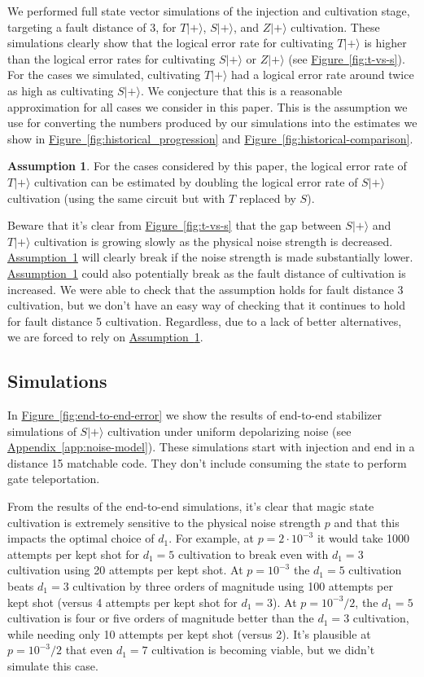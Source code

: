 \documentclass[onecolumn,unpublished,a4paper]{quantumarticle}
\theoremstyle{definition}
\newtheorem{assumption}[definition]{Assumption}
\DeclareRobustCommand{\app}[1]{\hyperref[app:#1]{Appendix~\ref*{app:#1}}}
\newcommand{\ass}[1]{\hyperref[ass:#1]{Assumption~\ref*{ass:#1}}}
\newcommand{\fig}[1]{\hyperref[fig:#1]{Figure~\ref*{fig:#1}}}
\begin{document}
We performed full state vector simulations of the injection and cultivation stage, targeting a fault distance of 3, for $T|+\rangle$, $S|+\rangle$, and $Z|+\rangle$ cultivation.
These simulations clearly show that the logical error rate for cultivating $T|+\rangle$ is higher than the logical error rates for cultivating $S|+\rangle$ or $Z|+\rangle$ (see \fig{t-vs-s}).
For the cases we simulated, cultivating $T|+\rangle$ had a logical error rate around twice as high as cultivating $S|+\rangle$.
We conjecture that this is a reasonable approximation for all cases we consider in this paper.
This is the assumption we use for converting the numbers produced by our simulations into the estimates we show in \fig{historical_progression} and \fig{historical-comparison}.

\begin{assumption}
For the cases considered by this paper, the logical error rate of $T|+\rangle$ cultivation can be estimated by doubling the logical error rate of $S|+\rangle$ cultivation (using the same circuit but with $T$ replaced by $S$).
\label{ass:tbys}
\end{assumption}

Beware that it's clear from \fig{t-vs-s} that the gap between $S|+\rangle$ and $T|+\rangle$ cultivation is growing slowly as the physical noise strength is decreased.
\ass{tbys} will clearly break if the noise strength is made substantially lower.
\ass{tbys} could also potentially break as the fault distance of cultivation is increased.
We were able to check that the assumption holds for fault distance 3 cultivation, but we don't have an easy way of checking that it continues to hold for fault distance 5 cultivation.
Regardless, due to a lack of better alternatives, we are forced to rely on \ass{tbys}.


\subsection{Simulations}

In \fig{end-to-end-error} we show the results of end-to-end stabilizer simulations of $S|+\rangle$ cultivation under uniform depolarizing noise (see \app{noise-model}).
These simulations start with injection and end in a distance 15 matchable code.
They don't include consuming the state to perform gate teleportation.

From the results of the end-to-end simulations, it's clear that magic state cultivation is extremely sensitive to the physical noise strength $p$ and that this impacts the optimal choice of $d_1$.
For example, at $p=2 \cdot 10^{-3}$ it would take 1000 attempts per kept shot for $d_1=5$ cultivation to break even with $d_1=3$ cultivation using 20 attempts per kept shot.
At $p=10^{-3}$ the $d_1=5$ cultivation beats $d_1=3$ cultivation by three orders of magnitude using 100 attempts per kept shot (versus 4 attempts per kept shot for $d_1=3$).
At $p=10^{-3}/2$, the $d_1=5$ cultivation is four or five orders of magnitude better than the $d_1=3$ cultivation, while needing only 10 attempts per kept shot (versus 2).
It's plausible at $p=10^{-3}/2$ that even $d_1=7$ cultivation is becoming viable, but we didn't simulate this case.
\end{document}
